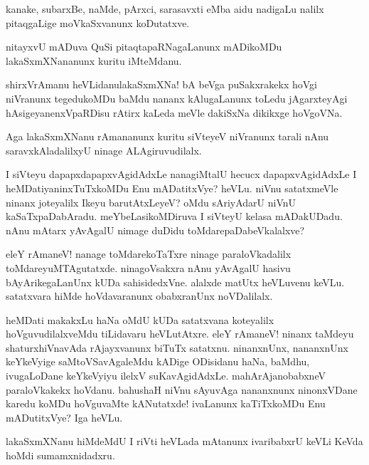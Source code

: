 \begin{mng}
kanake, subarxBe, naMde, pArxci, sarasavxti eMba aidu nadigaLu nalilx pitaqgaLige moVkaSxvanunx koDutatxve.
\end{mng}

\begin{mng}
nitayxvU mADuva QuSi pitaqtapaRNagaLanunx mADikoMDu lakaSxmXNananunx kuritu iMteMdanu.
\end{mng}

\begin{mng}
shirxVrAmanu heVLidanu\mdash lakaSxmXNa! bA beVga puSakxrakekx hoVgi niVranunx tegedukoMDu baMdu nananx kAlugaLanunx toLedu jAgarxteyAgi hAsigeyanenxVpaRDisu rAtirx kaLeda meVle dakiSxNa dikikxge hoVgoVNa.
\end{mng}

\begin{mng}
Aga lakaSxmXNanu rAmananunx kuritu siVteyeV niVranunx tarali nAnu saravxkAladalilxyU ninage ALAgiruvudilalx.
\end{mng}

\begin{mng}
I siVteyu dapapxdapapxvAgidAdxLe nanagiMtalU hecucx dapapxvAgidAdxLe I heMDatiyaninxTuTxkoMDu Enu mADatitxVye? heVLu. niVnu satatxmeVle ninanx joteyalilx Ikeyu barutAtxLeyeV? oMdu sAriyAdarU niVnU kaSaTxpaDabAradu. meYbeLasikoMDiruva I siVteyU kelasa mADakUDadu. nAnu mAtarx yAvAgalU nimage duDidu toMdarepaDabeVkalalxve?
\end{mng}

\begin{mng}
eleY rAmaneV! nanage toMdarekoTaTxre ninage paraloVkadalilx toMdareyuMTAgutatxde. ninagoVsakxra nAnu yAvAgalU hasivu bAyArikegaLanUnx kUDa sahisidedxVne. alalxde matUtx heVLuvenu keVLu. satatxvara hiMde hoVdavaranunx obabxranUnx noVDalilalx.
\end{mng}

\begin{mng}
heMDati makakxLu haNa oMdU kUDa satatxvana koteyalilx hoVguvudilalxveMdu tiLidavaru heVLutAtxre. eleY rAmaneV! ninanx taMdeyu shaturxhiVnavAda rAjayxvanunx biTuTx satatxnu. ninanxnUnx, nananxnUnx keYkeVyige saMtoVSavAgaleMdu kADige ODisidanu haNa, baMdhu, ivugaLoDane keYkeVyiyu ilelxV suKavAgidAdxLe. mahArAjanobabxneV paraloVkakekx hoVdanu. bahushaH niVnu sAyuvAga nananxnunx ninonxVDane karedu koMDu hoVguvaMte kANutatxde! ivaLanunx kaTiTxkoMDu Enu mADutitxVye? Iga heVLu.
\end{mng}

\begin{mng}
lakaSxmXNanu hiMdeMdU I riVti heVLada mAtanunx ivaribabxrU keVLi KeVda hoMdi sumamxnidadxru.
\end{mng}

